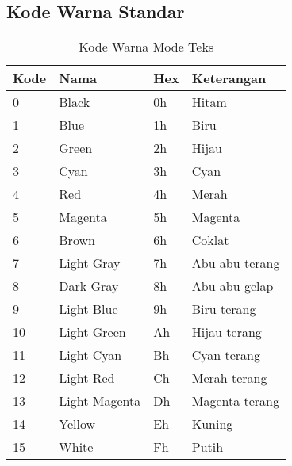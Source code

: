 \documentclass[../main.tex]{subfiles}
\begin{document}
            \subsection{Kode Warna Standar}
                \begin{table}[H]
                    \centering
                    \caption{Kode Warna Mode Teks}
                    \begin{tabular}{|p{1.5cm}|p{2cm}|p{2cm}|p{5cm}|}
                    \hline
                    \textbf{Kode} & \textbf{Nama} & \textbf{Hex} & \textbf{Keterangan} \\
                    \hline
                    0 & Black & 0h & Hitam \\
                    \hline
                    1 & Blue & 1h & Biru \\
                    \hline
                    2 & Green & 2h & Hijau \\
                    \hline
                    3 & Cyan & 3h & Cyan \\
                    \hline
                    4 & Red & 4h & Merah \\
                    \hline
                    5 & Magenta & 5h & Magenta \\
                    \hline
                    6 & Brown & 6h & Coklat \\
                    \hline
                    7 & Light Gray & 7h & Abu-abu terang \\
                    \hline
                    8 & Dark Gray & 8h & Abu-abu gelap \\
                    \hline
                    9 & Light Blue & 9h & Biru terang \\
                    \hline
                    10 & Light Green & Ah & Hijau terang \\
                    \hline
                    11 & Light Cyan & Bh & Cyan terang \\
                    \hline
                    12 & Light Red & Ch & Merah terang \\
                    \hline
                    13 & Light Magenta & Dh & Magenta terang \\
                    \hline
                    14 & Yellow & Eh & Kuning \\
                    \hline
                    15 & White & Fh & Putih \\
                    \hline
                    \end{tabular}
                \end{table}
\end{document}

